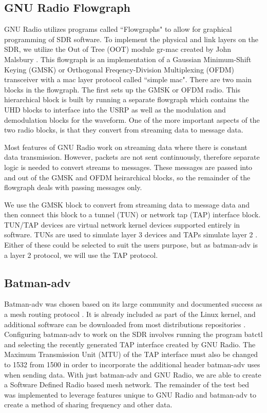 \subsection{GNU Radio Flowgraph}

GNU Radio utilizes programs called ``Flowgraphs" to allow for graphical programming of SDR software. To implement the physical and link layers on the SDR, we utilize the Out of Tree (OOT) module gr-mac created by John Malsbury \cite{0015}. This flowgraph is an implementation of a Gaussian Minimum-Shift Keying (GMSK) or Orthogonal Freqency-Division Multiplexing (OFDM) transceiver with a mac layer protocol called ``simple mac". There are two main blocks in the flowgraph. The first sets up the GMSK or OFDM radio. This hierarchical block is built by running a separate flowgraph which contains the UHD blocks to interface into the USRP as well as the modulation and demodulation blocks for the waveform. One of the more important aspects of the two radio blocks, is that they convert from streaming data to message data. 

Most features of GNU Radio work on streaming data where there is constant data transmission. However, packets are not sent continuously, therefore separate logic is needed to convert streams to messages. These messages are passed into and out of the GMSK and OFDM heirarchical blocks, so the remainder of the flowgraph deals with passing messages only. 

We use the GMSK block to convert from streaming data to message data and then connect this block to a tunnel (TUN) or network tap (TAP) interface block. TUN/TAP devices are virtual network kernel devices supported entirely in software. TUNs are used to simulate layer 3 devices and TAPs simulate layer 2 \cite{0017}. Either of these could be selected to suit the users purpose, but as batman-adv is a layer 2 protocol, we will use the TAP protocol.

\subsection{Batman-adv}

Batman-adv was chosen based on its large community and documented success as a mesh routing protocol \cite{5375690}. It is already included as part of the Linux kernel, and additional software can be downloaded from most distributions repositories \cite{0008}. Configuring batman-adv to work on the SDR involves running the program batctl and selecting the recently generated TAP interface created by GNU Radio. The Maximum Transmission Unit (MTU) of the TAP interface must also be changed to 1532 from 1500 in order to incorporate the additional header batman-adv uses when sending data. With just batman-adv and GNU Radio, we are able to create a Software Defined Radio based mesh network. The remainder of the test bed was implemented to leverage features unique to GNU Radio and batman-adv to create a method of sharing frequency and other data. 

